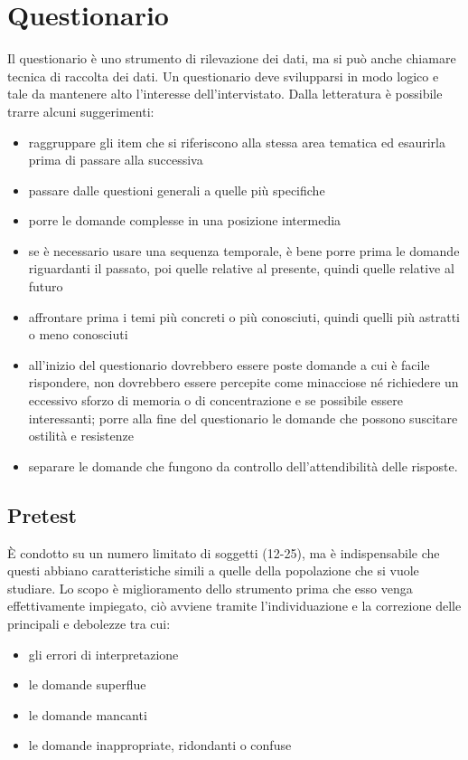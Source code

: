 \section{Questionario}
Il questionario è uno strumento di rilevazione dei dati, ma si può anche chiamare tecnica di raccolta dei dati. \newline
Un questionario deve svilupparsi in modo logico e tale da mantenere alto l’interesse dell'intervistato. \newline
Dalla letteratura è possibile trarre alcuni suggerimenti:
\begin{itemize}
	\item raggruppare gli item che si riferiscono alla stessa area tematica ed esaurirla prima di passare alla successiva
	\item passare dalle questioni generali a quelle più specifiche
	\item porre le domande complesse in una posizione intermedia
	\item se è necessario usare una sequenza temporale, è bene porre prima  le domande riguardanti il passato, poi quelle relative al presente, quindi quelle relative al futuro
	\item affrontare prima i temi più concreti o più conosciuti, quindi quelli più astratti o meno conosciuti
	\item all’inizio del questionario dovrebbero essere poste domande a cui è facile rispondere, non dovrebbero essere percepite come minacciose né richiedere un eccessivo sforzo di memoria o di concentrazione e se possibile essere interessanti; porre alla fine del questionario le domande che possono suscitare ostilità e resistenze
	\item separare le domande che fungono da controllo dell'attendibilità delle risposte.
\end{itemize}

\subsection{Pretest}
È condotto su un numero limitato di soggetti (12-25), ma è indispensabile che questi abbiano caratteristiche simili a quelle della popolazione che si vuole studiare.
Lo scopo è miglioramento dello strumento prima che esso venga effettivamente impiegato, ciò avviene tramite l'individuazione e la correzione delle principali e debolezze tra cui:
\begin{itemize}
	\item gli errori di interpretazione
	\item le domande superflue
	\item le domande mancanti
	\item le domande inappropriate, ridondanti o confuse
\end{itemize}

